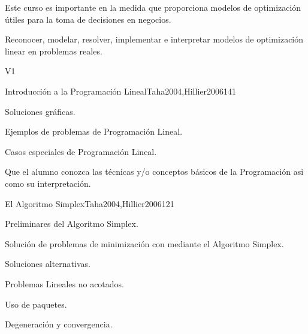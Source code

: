 \begin{syllabus}


\begin{justification}
Este curso es importante en la medida que proporciona modelos de optimización útiles para la toma de decisiones en negocios.
\end{justification}

\begin{goals}
\item Reconocer, modelar, resolver, implementar e interpretar modelos de optimización linear en problemas reales.
\end{goals}

\begin{outcomes}{V1}
\end{outcomes}

\begin{unit}{Introducción a la Programación Lineal}{}{Taha2004,Hillier2006}{14}{1}
   \begin{topics}
      \item Soluciones gráficas.
      \item Ejemplos de problemas de Programación Lineal.
      \item Casos especiales de Programación Lineal.
   \end{topics}

   \begin{learningoutcomes}
      \item Que el alumno conozca las técnicas y/o conceptos básicos de la Programación asi como su interpretación.
   \end{learningoutcomes}
\end{unit}

\begin{unit}{El Algoritmo Simplex}{}{Taha2004,Hillier2006}{12}{1}
   \begin{topics}
      \item Preliminares del Algoritmo Simplex.
      \item Solución de problemas de minimización con mediante el Algoritmo Simplex.
      \item Soluciones alternativas.
      \item Problemas Lineales no acotados.
      \item Uso de paquetes.
      \item Degeneración y convergencia.
   \end{topics}


\end{unit}
\end{syllabus}
